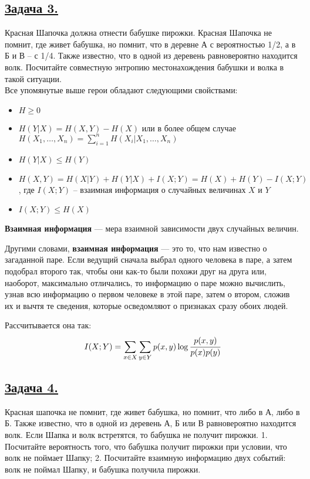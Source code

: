 \subsection*{\hyperref[sec:sol_problem3]{Задача 3.}}\label{sec:problem3} Красная Шапочка должна отнести бабушке пирожки. Красная Шапочка не помнит, где живет бабушка, но помнит, что в деревне А с вероятностью 1/2, а в Б и В – с 1/4. Также известно, что в одной из деревень равновероятно находится волк. Посчитайте совместную энтропию местонахождения бабушки и волка в такой ситуации.
\\ 

Все упомянутые выше герои обладают следующими свойствами:

\begin{itemize}
    \item $H \geqslant 0$
    \item $H(Y|X)=H(X, Y)-H(X)$ или в более общем случае $H(X_1, \ldots, X_n)=\sum\limits_{i=1}^n H(X_i|X_1, \ldots, X_n)$
    \item $H(Y|X)\leqslant H(Y)$
    \item $H(X, Y)=H(X|Y)+H(Y|X)+I(X; Y)=H(X)+H(Y)-I(X; Y)$, где $I(X; Y)$ -- взаимная информация о случайных величинах $X$ и $Y$
    \item $I(X; Y)\leqslant H(X)$
\end{itemize}

\begin{siderules}
    \textbf{Взаимная информация} --- мера взаимной зависимости двух случайных величин.
\end{siderules}

Другими словами, \textbf{взаимная информация} --- это то, что нам известно о загаданной паре. Если ведущий сначала выбрал одного человека в паре, а затем подобрал второго так, чтобы они как-то были похожи друг на друга или, наоборот, максимально отличались, то информацию о паре можно вычислить, узнав всю информацию о первом человеке в этой паре, затем о втором, сложив их и вычтя те сведения, которые осведомляют о признаках сразу обоих людей.

Рассчитывается она так:
\[I(X; Y)=\sum\limits_{x\in X}\sum\limits_{y\in Y} p(x, y)\log \cfrac{p(x, y)}{p(x)p(y)} \]

\subsection*{\hyperref[sec:sol_problem4]{Задача 4.}}\label{sec:problem4}  Красная шапочка не помнит, где живет бабушка, но помнит, что либо в А, либо в Б. Также известно, что в одной из деревень А, Б или В равновероятно находится волк. Если Шапка и волк встретятся, то бабушка не получит пирожки. 
1.	Посчитайте вероятность того, что бабушка получит пирожки при условии, что волк не поймает Шапку;
2.	Посчитайте взаимную информацию двух событий: волк не поймал Шапку, и бабушка получила пирожки.

